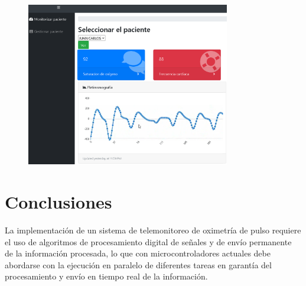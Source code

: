 \documentclass[journal]{IEEEtran}
\begin{document}
\begin{figure}[!h]
	\centering
	\includegraphics[width=3.5in]{resultado_aplicacion_web.png}
	\caption{
	\color{green}{		
		Prueba funcional de aplicación Web, la señal corresponde a la pletismografia en infrarojo; los recuadros en azul y rojo presentan el valor de SPO2 y la frecuencia cardíaca, respectivamente}}
	\label{resultado_aplicacion_web}
\end{figure}


%		
%			
%	
%			




\section{Conclusiones}


La implementación de un sistema de telemonitoreo de oximetría de pulso requiere el uso de algoritmos de procesamiento digital de señales y de envío permanente de la información procesada, lo que con microcontroladores actuales debe abordarse con la ejecución en paralelo de diferentes tareas en garantía del procesamiento y envío en tiempo real de la información.
\end{document}
